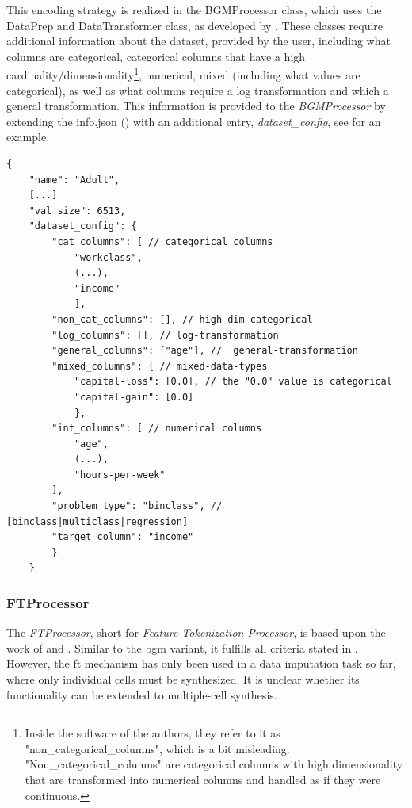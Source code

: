 This encoding strategy is realized in the BGMProcessor class, which uses the DataPrep and DataTransformer class, as developed by \cite{zhao2022CTABGANEnhancingTabular}.
These classes require additional information about the dataset, provided by the user, including what columns are categorical, categorical columns that have a high cardinality/dimensionality\footnote{Inside the software of the authors, they refer to it as "non\_categorical\_columns", which is a bit misleading. "Non\_categorical\_columns" are categorical columns with high dimensionality that are transformed into numerical columns and handled as if they were continuous.},
numerical, mixed (including what values are categorical), as well as what columns require a log transformation and which a general transformation.
This information is provided to the \textit{BGMProcessor} by extending the info.json () with an additional entry, \textit{dataset\_config}, see  for an example.

\begin{lstlisting}[label={lst:info_extended},caption={Example extended data info file from the adult dataset (\Autoref{ch:methods-datasets})}]
    {
    "name": "Adult",
    [...]
    "val_size": 6513,
    "dataset_config": {
        "cat_columns": [ // categorical columns
            "workclass", 
            (...), 
            "income"
            ],
        "non_cat_columns": [], // high dim-categorical
        "log_columns": [], // log-transformation
        "general_columns": ["age"], //  general-transformation             
        "mixed_columns": { // mixed-data-types
            "capital-loss": [0.0], // the "0.0" value is categorical           
            "capital-gain": [0.0]
            },
        "int_columns": [ // numerical columns 
            "age", 
            (...), 
            "hours-per-week"
        ],
        "problem_type": "binclass", // [binclass|multiclass|regression]
        "target_column": "income"
        }
    }
\end{lstlisting}

\subsubsection{FTProcessor}
\label{ch:FTProcessor}

The \textit{FTProcessor}, short for \textit{Feature Tokenization Processor}, is based upon the work of \textcite{zheng2022DiffusionModelsMissing} and \textcite{gorishniy2021RevisitingDeepLearning}.
Similar to the \gls{bgm} variant, it fulfills all criteria stated in .
However, the \gls{ft} mechanism has only been used in a data imputation task so far, where only individual cells must be synthesized.
It is unclear whether its functionality can be extended to multiple-cell synthesis.

